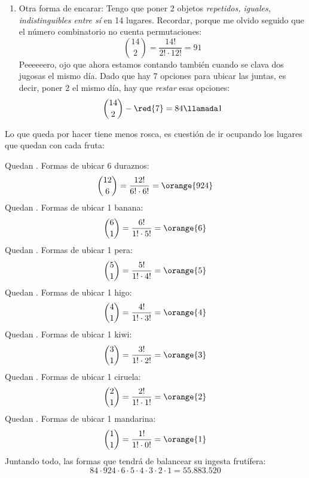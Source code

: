 \begin{enumerate}[label=\orange{\faIcon{lemon}$_\arabic*$)}]
  \item
        Otra forma de encarar: Tengo que poner 2 objetos \textit{repetidos, iguales, indistinguibles entre sí} en 14 lugares. Recordar, porque me olvido seguido que el número
        combinatorio no cuenta permutaciones:
        $$
          \binom{14}{2} = \frac{14!}{2! \cdot 12!} = 91
        $$
        Peeeeeero, ojo que ahora estamos contando también cuando \Pedro se clava dos jugosas  el mismo día. Dado que hay 7 opciones para ubicar
        las  juntas, es decir, poner 2  el mismo día, hay que \textit{restar} esas  opciones:
        $$
          \binom{14}{2} - \red{7} = 84 \llamada1
        $$
\end{enumerate}

Lo que queda por hacer tiene menos rosca, es cuestión de ir ocupando los lugares que quedan con cada fruta:

Quedan . Formas de ubicar 6 duraznos:
$$
  \binom{12}{6} = \frac{12!}{6! \cdot 6!} = \orange{924}
$$
Quedan . Formas de ubicar 1 banana:
$$
  \binom{6}{1} = \frac{6!}{1! \cdot 5!} = \orange{6}
$$
Quedan . Formas de ubicar 1 pera:
$$
  \binom{5}{1} = \frac{5!}{1! \cdot 4!} = \orange{5}
$$
Quedan . Formas de ubicar 1 higo:
$$
  \binom{4}{1} = \frac{4!}{1! \cdot 3!} = \orange{4}
$$
Quedan . Formas de ubicar 1 kiwi:
$$
  \binom{3}{1} = \frac{3!}{1! \cdot 2!} = \orange{3}
$$
Quedan . Formas de ubicar 1 ciruela:
$$
  \binom{2}{1} = \frac{2!}{1! \cdot 1!} = \orange{2}
$$
Quedan . Formas de ubicar 1 mandarina:
$$
  \binom{1}{1} = \frac{1!}{1! \cdot 0!} = \orange{1}
$$
Juntando todo, las formas que tendrá de balancear su ingesta frutífera:
$$
  84 \cdot 924 \cdot 6 \cdot 5 \cdot 4 \cdot 3 \cdot 2 \cdot 1 = 55.883.520
$$

\begin{aportes}
  \item {}
\end{aportes}
